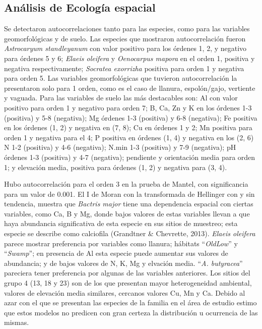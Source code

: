 \documentclass[11pt,]{article}
\begin{document}
\subsection{Análisis de Ecología
espacial}\label{anuxe1lisis-de-ecologuxeda-espacial-1}

Se detectaron autocorrelaciones tanto para las especies, como para las
variables geomorfológicas y de suelo. Las especies que mostraron
autocorrelación fueron \emph{Astrocaryum standleyanum} con valor
positivo para los órdenes 1, 2, y negativo para órdenes 5 y 6;
\emph{Elaeis oleifera} y \emph{Oenocarpus mapora} en el orden 1,
positiva y negativa respectivamente; \emph{Socratea exorrizha} positiva
para orden 1 y negativa para orden 5. Las variables geomorfológicas que
tuvieron autocorrelación la presentaron solo para 1 orden, como es el
caso de llanura, espolón/gajo, vertiente y vaguada. Para las variables
de suelo las más destacables son: Al con valor positivo para orden 1 y
negativo para orden 7; B, Ca, Zn y K en los órdenes 1-3 (positiva) y 5-8
(negativa); Mg órdenes 1-3 (positiva) y 6-8 (negativa); Fe positiva en
los órdenes (1, 2) y negativa en (7, 8); Cu en órdenes 1 y 2; Mn
positiva para orden 1 y negativa para el 4; P positiva en órdenes (1, 4)
y negativa en los (2, 6) N 1-2 (positiva) y 4-6 (negativa); N.min 1-3
(positiva) y 7-9 (negativa); pH órdenes 1-3 (positiva) y 4-7 (negativa);
pendiente y orientación media para orden 1; y elevación media, positiva
para órdenes (1, 2) y negativa para (3, 4).

Hubo autocorrelación para el orden 3 en la prueba de Mantel, con
significancia para un valor de 0.001. El I de Moran con la transformada
de Hellinger con y sin tendencia, muestra que \emph{Bactris major} tiene
una dependencia espacial con ciertas variables, como Ca, B y Mg, donde
bajos valores de estas variables llevan a que haya abundancia
significativa de esta especie en sus sitios de muestreo; esta especie se
describe como calciofila (Grandtner \& Chevrette, 2013). \emph{Elaeis
oleifera} parece mostrar preferencia por variables como llanura;
hábitats ``\emph{OldLow}'' y ``\emph{Swamp}''; en presencia de Al esta
especie puede aumentar sus valores de abundancia; y de bajos valores de
N, K, Mg y elvación media. ``\emph{A. butyracea}'' pareciera tener
preferencia por algunas de las variables anteriores. Los sitios del
grupo 4 (13, 18 y 23) son de los que presentan mayor heterogeneidad
ambiental, valores de elevación media similares, cercanos valores Cu, Mn
y Ca. Debido al azar con el que se presentan las especies de la familia
en el área de estudio estimo que estos modelos no predicen con gran
certeza la distribución u ocurrencia de las mismas.
\end{document}

